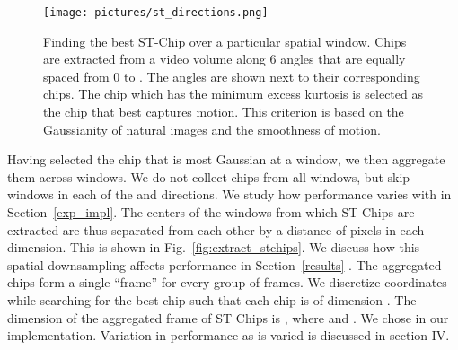 \documentclass[journal]{IEEEtran}
\begin{document}
\begin{figure} 
  \texttt{[image: pictures/st\_directions.png]}
  \caption{Finding the best ST-Chip over a particular  spatial window. Chips are extracted from a  video volume along 6 angles that are equally spaced from 0 to . The angles are shown next to their corresponding chips. The chip which has the minimum excess kurtosis is selected as the chip that best captures motion. This criterion is based on the Gaussianity of natural images and the smoothness of motion.}\label{fig:stdir}
  \vspace{-4mm}
\end{figure}

Having selected the chip that is most Gaussian at a window, we then aggregate them across windows. We do not collect chips from all  windows, but skip  windows in each of the  and  directions. We study how performance varies with  in Section~\ref{exp_impl}. The centers of the windows from which ST Chips are extracted are thus separated from each other by a distance of  pixels in each dimension. This is shown in Fig.~\ref{fig:extract_stchips}. We discuss how this spatial downsampling affects performance in Section~\ref{results} . The aggregated chips form a single ``frame''  for every group of  frames. We discretize coordinates while searching for the best chip such that each chip is of dimension . The dimension of the aggregated frame  of ST Chips is , where  and . We chose  in our implementation. Variation in performance as  is varied is discussed in section IV. 
\end{document}
